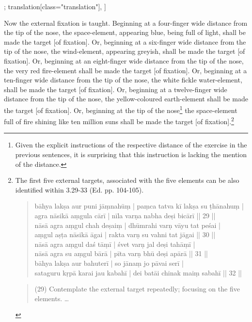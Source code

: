 \begin{alignment}[
  texts=edition[class="edition"];
  translation[class="translation"],
  ]
\begin{translation}
\begin{tlate}
  \noindent
  Now the external fixation is taught. Beginning at a four-finger wide distance from the tip of the nose, the space-element, appearing blue, being full of light, shall be made the target [of fixation]. Or, beginning at a six-finger wide distance from the tip of the nose, the wind-element, appearing greyish, shall be made the target [of fixation]. Or, beginning at an eight-finger wide distance from the tip of the nose, the very red fire-element shall be made the target [of fixation]. Or, beginning at a ten-finger wide distance from the tip of the nose, the white fickle water-element, shall be made the target [of fixation].\textsuperscript{\coro{[\lowroman{5}]}} Or, beginning at a twelve-finger wide distance from the tip of the nose, the yellow-coloured earth-element shall be made the target [of fixation]. Or, beginning at the tip of the nose\footnote{Given the explicit instructions of the respective distance of the exercise in the previous sentences, it is surprising that this instruction is lacking the mention of the distance.} the space-element full of fire shining like ten million suns shall be made the target [of fixation].\footnote{The first five external targets, associated with the five elements can be also identified within  3.29-33 (Ed. pp. 104-105).  
    \begin{quote}
bāhya lakṣa aur puni jāṃnahūṃ | paṃca tatva kī lakṣa su ṭhānahuṃ |\\
agra nāsikā aṃgula cārī | nīla varṇa nabha deṣi bicārī || 29 ||\\  
nāsā agra aṃgul chah deṣaiṃ | dhūmrahi varṇ vāyu tat peśai |\\
aṃgul aṣṭa nāsikā āgai | rakta varṇ su vahni tat jāgai || 30 ||\\
nāsā agra aṃgul daś tāṃī | śvet varṇ jal deṣi tahāṃī |\\
nāsā agra su aṃgul bārā | pīta varṇ bhū deṣi apārā || 31 ||\\
bāhya lakṣa aur bahuterī | so jānaṃ jo pāvai serī | \\
sataguru kṛpā karai jau kabahī | dei batāi chinak maiṃ sabahī || 32 ||\\
\end{quote}
\begin{quote}
  (29) Contemplate the external target repeatedly; focusing on the five elements. \ldots
\end{quote}
}
    \end{tlate}
  \end{translation}
\end{alignment}
